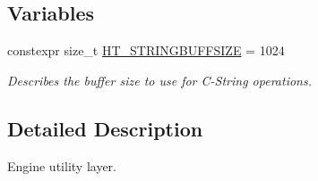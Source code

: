 \subsection*{Variables}
\begin{DoxyCompactItemize}
\item 
constexpr size\+\_\+t \hyperlink{namespaceHatchit_1_1Core_a2b5e66afde67284001830baf2724cb2c}{H\+T\+\_\+\+S\+T\+R\+I\+N\+G\+B\+U\+F\+F\+S\+I\+ZE} = 1024\hypertarget{namespaceHatchit_1_1Core_a2b5e66afde67284001830baf2724cb2c}{}\label{namespaceHatchit_1_1Core_a2b5e66afde67284001830baf2724cb2c}

\begin{DoxyCompactList}\small\item\em Describes the buffer size to use for C-\/\+String operations. \end{DoxyCompactList}\end{DoxyCompactItemize}


\subsection{Detailed Description}
Engine utility layer. 